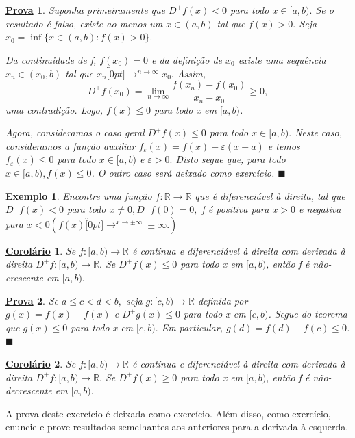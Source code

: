 \documentclass{article}
\newtheorem{example}{\underline{Exemplo}}
\newtheorem*{proof*}{\underline{Prova}}
\newtheorem*{crl*}{\underline{Corol\'ario}}
\renewcommand\qedsymbol{$\blacksquare$}
\begin{document}
\begin{proof*}
  Suponha primeiramente que \(D^{+}f(x) < 0\) para todo \(x\in[a, b).\) Se o resultado
é falso, existe ao menos um \(x\in(a, b)\) tal que \(f(x) > 0.\) Seja
\(x_{0}=\inf\{x\in(a, b): f(x) > 0\}.\)

  Da continuidade de f, \(f(x_{0}) = 0\) e da defini\c cão de \(x_{0}\) existe 
uma sequência \(x_{n}\in(x_{0}, b)\) tal que \(x_{n}\overbracket[0pt]{\longrightarrow}^{n\to \infty}x_{0}.\)
Assim, 
  \[
    D^{+}f(x_{0}) = \lim_{n\to \infty}\frac{f(x_{n})-f(x_{0})}{x_{n}-x_{0}}\geq 0,
  \]
uma contradi\c cão. Logo, \(f(x)\leq 0\) para todo x em \([a, b)\).

  Agora, consideramos o caso geral \(D^{+}f(x)\leq 0\) para todo \(x\in[a, b).\)
Neste caso, consideramos a fun\c cão auxiliar \(f_{\varepsilon }(x) = f(x) - \varepsilon (x-a)\) 
e temos \(f_{\varepsilon }(x)\leq 0\) para todo \(x\in[a, b)\) e \(\varepsilon >0.\)
Disto segue que, para todo \(x\in[a, b), f(x)\leq 0\). O outro caso será deixado como
exercício. \qedsymbol
\end{proof*}
\begin{example}
  Encontre uma fun\c cão \(f:\mathbb{R}\rightarrow \mathbb{R}\) que é diferenciável
  à direita, tal que \(D^{+}f(x) < 0\) para todo \(x\neq0, D^{+}f(0)=0,\) f é positiva
  para \(x > 0\) e negativa para \(x < 0 (f(x)\overbracket[0pt]{\longrightarrow}^{x\to \pm\infty}\pm\infty.)\)
\end{example}
 \begin{crl*}
   Se \(f:[a, b)\rightarrow \mathbb{R}\) é contínua e diferenciável à direita com derivada
à direita \(D^{+}f:[a, b)\rightarrow \mathbb{R}.\) Se \(D^{+}f(x)\leq 0\) para todo x em \([a, b)\),
então f é não-crescente em \([a, b).\)
 \end{crl*}
\begin{proof*}
  Se \(a\leq c < d < b,\) seja \(g:[c, b)\rightarrow \mathbb{R}\) definida por 
 \(g(x) = f(x) - f(x)\) e \(D^{+}g(x)\leq 0\) para todo x em \([c, b)\). Segue do 
 teorema que \(g(x)\leq 0\) para todo x em \([c, b).\) Em particular, \(g(d) = f(d) - f(c)\leq 0\). \qedsymbol
\end{proof*}
\begin{crl*}
  Se \(f:[a, b)\rightarrow \mathbb{R}\) é contínua e diferenciável à direita com
derivada à direita \(D^{+}f:[a, b)\rightarrow \mathbb{R}.\) Se \(D^{+}f(x)\geq 0\)
para todo x em \([a, b)\), então f é não-decrescente em \([a, b).\)
\end{crl*}
  A prova deste exercício é deixada como exercício. Além disso, como exercício,
enuncie e prove resultados semelhantes aos anteriores para a derivada à esquerda.
\newpage
\end{document}

